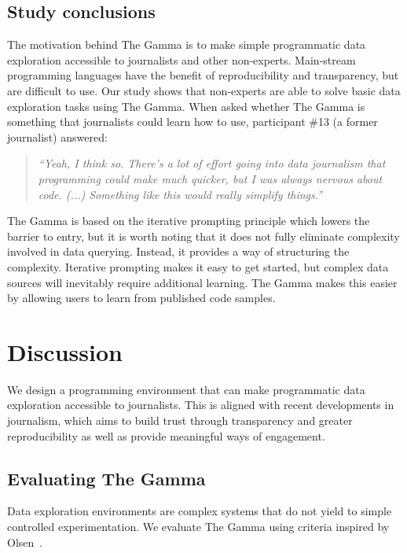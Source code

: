 \documentclass[manuscript,review,anonymous]{acmart}
\begin{document}
\subsection{Study conclusions}
The motivation behind The Gamma is to make simple programmatic data exploration accessible to
journalists and other non-experts. Main-stream programming languages have the benefit of
reproducibility and transparency, but are difficult to use. Our study shows that non-experts
are able to solve basic data exploration tasks using The Gamma. When asked whether The Gamma
is something that journalists could learn how to use, participant \#13 (a former journalist) answered:

\begin{quote}
\emph{``Yeah, I think so. There's a lot of effort going into data journalism that
  programming could make much quicker, but I was always nervous about code. (...)
  Something like this would really simplify things.''}
\end{quote}

The Gamma is based on the iterative prompting principle which lowers the barrier to entry, but
it is worth noting that it does not fully eliminate complexity involved in data querying.
Instead, it provides a way of structuring the complexity. Iterative prompting makes it easy to
get started, but complex data sources will inevitably require additional learning. The Gamma
makes this easier by allowing users to learn from published code samples.


\section{Discussion}
We design a programming environment that can make programmatic data exploration accessible
to journalists. This is aligned with recent developments in journalism, which aims to build
trust through transparency and greater reproducibility as well as provide meaningful ways of
engagement.

\subsection{Evaluating The Gamma}
Data exploration environments are complex systems that do not yield to simple controlled
experimentation. We evaluate The Gamma using criteria inspired by Olsen~\cite{evaluating}.
\end{document}
